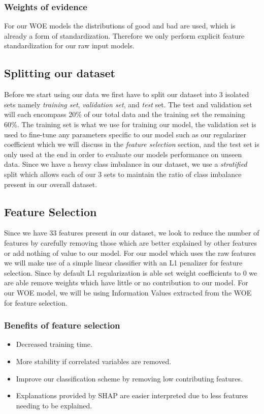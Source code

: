 \subsubsection{Weights of evidence}
For our WOE models the distributions of good and bad are used, which is already a form of standardization. Therefore we only perform explicit feature standardization for our raw input models.
\subsection{Splitting our dataset}
Before we start using our data we first have to split our dataset into 3 isolated sets namely \emph{training set}, \emph{validation set}, and \emph{test} set. The test and validation set will each encompass 20\% of our total data and the training set the remaining 60\%. The training set is what we use for training our model, the validation set is used to fine-tune any parameters specific to our model such as our regularizer coefficient which we will discuss in the \emph{feature selection} section, and the test set is only used at the end in order to evaluate our models performance on unseen data. Since we have a heavy class imbalance in our dataset, we use a \emph{stratified} split which allows each of our 3 sets to maintain the ratio of class imbalance present in our overall dataset.
\subsection{Feature Selection}
Since we have 33 features present in our dataset, we look to reduce the number of features by carefully removing those which are better explained by other features or add nothing of value to our model.  For our model which uses the raw features we will make use of a simple linear classifier with an L1 penalizer for feature selection. Since by default L1 regularization is able set weight coefficients to 0 we are able remove weights which have little or no contribution to our model. For our WOE model, we will be using Information Values extracted from the WOE for feature selection.

\subsubsection{Benefits of feature selection}
\begin{itemize}
    \item Decreased training time.
    \item More stability if correlated variables are removed.
    \item Improve our classification scheme by removing low contributing features.
    \item Explanations provided by SHAP are easier interpreted due to less features needing to be explained.
\end{itemize}

